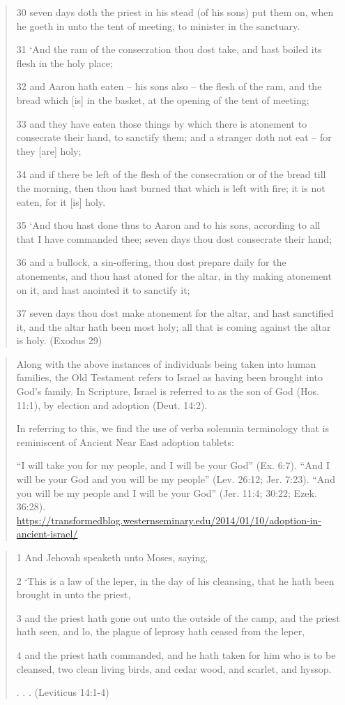 \documentclass[11pt]{article}
\begin{document}
\begin{quote}
30 seven days doth the priest in his stead (of his sons) put them on, when he goeth in unto the tent of meeting, to minister in the sanctuary.

31 `And the ram of the consecration thou dost take, and hast boiled its flesh in the holy place;

32 and Aaron hath eaten -- his sons also -- the flesh of the ram, and the bread which [is] in the basket, at the opening of the tent of meeting;

33 and they have eaten those things by which there is atonement to consecrate their hand, to sanctify them; and a stranger doth not eat -- for they [are] holy;

34 and if there be left of the flesh of the consecration or of the bread till the morning, then thou hast burned that which is left with fire; it is not eaten, for it [is] holy.

35 `And thou hast done thus to Aaron and to his sons, according to all that I have commanded thee; seven days thou dost consecrate their hand;

36 and a bullock, a sin-offering, thou dost prepare daily for the atonements, and thou hast atoned for the altar, in thy making atonement on it, and hast anointed it to sanctify it;

37 seven days thou dost make atonement for the altar, and hast sanctified it, and the altar hath been most holy; all that is coming against the altar is holy.
(Exodus 29)
\end{quote}

\begin{quote}
Along with the above instances of individuals being taken into human families, the Old Testament refers to Israel as having been brought into God’s family. In Scripture, Israel is referred to as the son of God (Hos. 11:1), by election and adoption (Deut. 14:2).

In referring to this, we find the use of verba solemnia terminology that is reminiscent of Ancient Near East adoption tablets:

“I will take you for my people, and I will be your God” (Ex. 6:7).
“And I will be your God and you will be my people” (Lev. 26:12; Jer. 7:23).
“And you will be my people and I will be your God” (Jer. 11:4; 30:22; Ezek. 36:28).
\url{https://transformedblog.westernseminary.edu/2014/01/10/adoption-in-ancient-israel/}
\end{quote}

\begin{quote}
1 And Jehovah speaketh unto Moses, saying,

2 `This is a law of the leper, in the day of his cleansing, that he hath been brought in unto the priest,

3 and the priest hath gone out unto the outside of the camp, and the priest hath seen, and lo, the plague of leprosy hath ceased from the leper,

4 and the priest hath commanded, and he hath taken for him who is to be cleansed, two clean living birds, and cedar wood, and scarlet, and hyssop.

. . . 
(Leviticus 14:1-4)
\end{quote}
\end{document}
